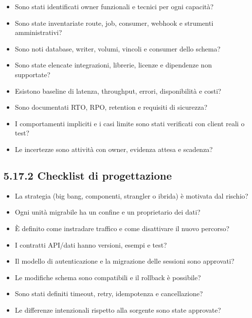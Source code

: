 \documentclass[
  italian,
  10pt,
]{book}
\providecommand{\tightlist}{%
  \setlength{\itemsep}{0pt}\setlength{\parskip}{0pt}}
\begin{document}
\begin{itemize}
\tightlist
\item[$\square$]
  Sono stati identificati owner funzionali e tecnici per ogni capacità?
\item[$\square$]
  Sono state inventariate route, job, consumer, webhook e strumenti
  amministrativi?
\item[$\square$]
  Sono noti database, writer, volumi, vincoli e consumer dello schema?
\item[$\square$]
  Sono state elencate integrazioni, librerie, licenze e dipendenze non
  supportate?
\item[$\square$]
  Esistono baseline di latenza, throughput, errori, disponibilità e
  costi?
\item[$\square$]
  Sono documentati RTO, RPO, retention e requisiti di sicurezza?
\item[$\square$]
  I comportamenti impliciti e i casi limite sono stati verificati con
  client reali o test?
\item[$\square$]
  Le incertezze sono attività con owner, evidenza attesa e scadenza?
\end{itemize}

\subsection{5.17.2 Checklist di
progettazione}\label{checklist-di-progettazione}

\begin{itemize}
\tightlist
\item[$\square$]
  La strategia (big bang, componenti, strangler o ibrida) è motivata dal
  rischio?
\item[$\square$]
  Ogni unità migrabile ha un confine e un proprietario dei dati?
\item[$\square$]
  È definito come instradare traffico e come disattivare il nuovo
  percorso?
\item[$\square$]
  I contratti API/dati hanno versioni, esempi e test?
\item[$\square$]
  Il modello di autenticazione e la migrazione delle sessioni sono
  approvati?
\item[$\square$]
  Le modifiche schema sono compatibili e il rollback è possibile?
\item[$\square$]
  Sono stati definiti timeout, retry, idempotenza e cancellazione?
\item[$\square$]
  Le differenze intenzionali rispetto alla sorgente sono state
  approvate?
\end{itemize}
\end{document}
